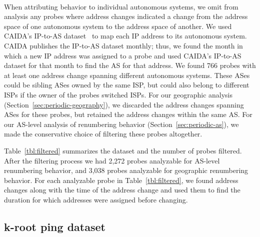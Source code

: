 \par {}\\
When attributing behavior to individual autonomous systems,
we omit from analysis any probes where address changes
indicated a change from the address space of one autonomous
system to the address space of another.  We used CAIDA's IP-to-AS
dataset~\cite{caidapfx2as} to map each IP address to its autonomous
system. CAIDA publishes the IP-to-AS dataset monthly; thus, we found
the month in which a new IP address was assigned to a probe and used
CAIDA's IP-to-AS dataset for that month to find
the AS for that address. We found 766 probes with at least one
address change spanning different autonomous systems.  These ASes
could be sibling ASes owned by the same ISP, but could also
belong to different ISPs if the owner of the probes switched
ISPs. For our geographic analysis 
(Section~\ref{sec:periodic-geography}), we discarded the address
changes spanning ASes for these probes, but retained the
address changes within the same AS. For our AS-level
analysis of renumbering behavior
(Section~\ref{sec:periodic-as}), we made the conservative choice
of filtering these probes altogether.

Table~\ref{tbl:filtered} summarizes the dataset and the
number of probes filtered.  After the filtering process we
had 2,272 probes analyzable for AS-level
renumbering behavior, and 3,038 probes analyzable for
geographic renumbering behavior.  For each analyzable probe
in Table~\ref{tbl:filtered}, we found address changes along
with the time of the address change and used them to find
the duration for which addresses were assigned before
changing.

\subsection{k-root ping dataset}
\label{sec:pings_to_k}

